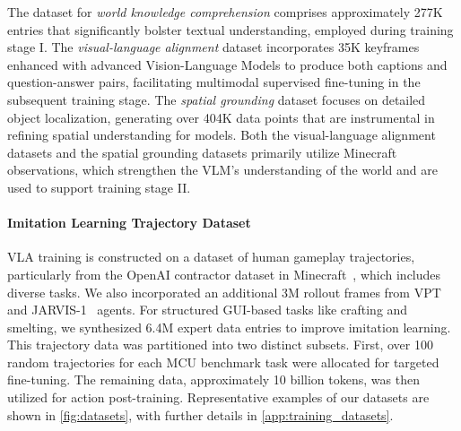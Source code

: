 The dataset for \textit{world knowledge comprehension} comprises approximately 277K entries that significantly bolster textual understanding, employed during training stage I. The \textit{visual-language alignment} dataset incorporates 35K keyframes enhanced with advanced Vision-Language Models to produce both captions and question-answer pairs, facilitating multimodal supervised fine-tuning in the subsequent training stage. The \textit{spatial grounding} dataset focuses on detailed object localization, generating over 404K data points that are instrumental in refining spatial understanding for \method models. Both the visual-language alignment datasets and the spatial grounding datasets primarily utilize Minecraft observations, which strengthen the VLM's understanding of the world and are used to support training stage II. 

\paragraph{Imitation Learning Trajectory Dataset}
VLA training is constructed on a dataset of human gameplay trajectories, particularly from the OpenAI contractor dataset in Minecraft~\citep{vpt}, which includes diverse tasks. We also incorporated an additional 3M rollout frames from VPT~\citep{vpt} and JARVIS-1~\citep{jarvis1} agents. For structured GUI-based tasks like crafting and smelting, we synthesized 6.4M expert data entries to improve imitation learning. This trajectory data was partitioned into two distinct subsets. First, over 100 random trajectories for each MCU benchmark task were allocated for targeted fine-tuning. The remaining data, approximately 10 billion tokens, was then utilized for action post-training. Representative examples of our datasets are shown in \autoref{fig:datasets}, with further details in \autoref{app:training_datasets}.



